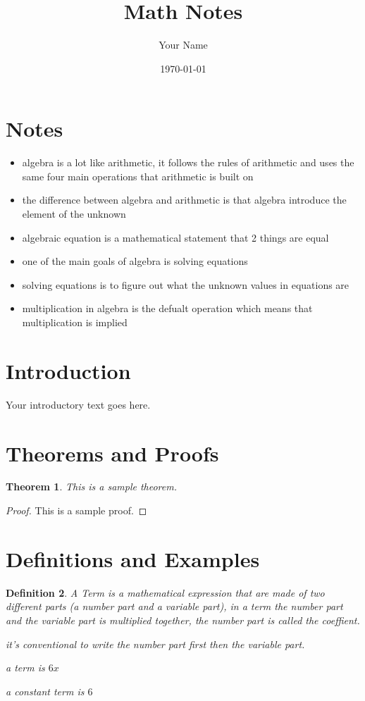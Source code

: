 \documentclass[12pt]{article}
\title{Math Notes}
\author{Your Name}
\date{\today}
\newtheorem{theorem}{Theorem}[section]
\newtheorem{definition}[theorem]{Definition}
\begin{document}
\maketitle

\section{Notes}

\begin{itemize}
	\item algebra is a lot like arithmetic, it follows the rules of arithmetic and uses the same four main operations that arithmetic is built on
	\item the difference between algebra and arithmetic is that algebra introduce the element of the unknown
	\item algebraic equation is a mathematical statement that 2 things are equal
	\item one of the main goals of algebra is solving equations
	\item solving equations is to figure out what the unknown values in equations are
	\item multiplication in algebra is the defualt operation which means that multiplication is implied
\end{itemize}


\section{Introduction}

Your introductory text goes here.

\section{Theorems and Proofs}

\begin{theorem}
	This is a sample theorem.
\end{theorem}

\begin{proof}
	This is a sample proof.
\end{proof}

\section{Definitions and Examples}

\begin{definition}
	A Term is a mathematical expression that are made of two different parts (a number part and a variable part), in a term the number part and the variable part is multiplied together, the number part is called the coeffient.

	it's conventional to write the number part first then the variable part.

	a term is $6x$

	a constant term is $6$
\end{definition}
\end{document}
